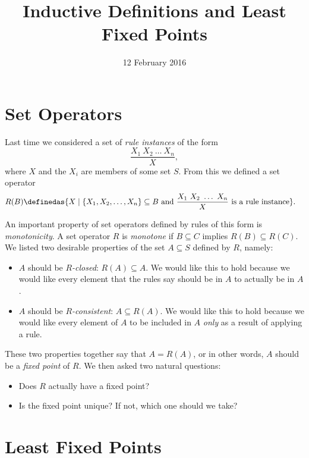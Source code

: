 \title{Inductive Definitions and Least Fixed Points}
\date{12 February 2016}
\maketitle

\section{Set Operators}

Last time we considered a set of \emph{rule instances} of the form
\begin{equation}
\frac{X_1\ X_2\ \ldots\ X_n}{X},\label{eqn:rule}
\end{equation}
where $X$ and the $X_i$ are members of some set $S$. From this we defined a set operator
\begin{align}
R(B) &\definedas \{X \mid \mbox{$\{X_1,X_2,\ldots,X_n\}\subseteq B$ and $\displaystyle\frac{X_1\ X_2\ \ldots\ X_n}X$ is a rule instance}\}.\label{eqn:rulebased}
\end{align}

An important property of set operators defined by rules of this form is \emph{monotonicity}. A set operator $R$ is \emph{monotone} if $B\subseteq C$ implies $R(B)\subseteq R(C)$. We listed two desirable properties of the set $A\subseteq S$ defined by $R$, namely:
\begin{itemize}
\item
$A$ should be \emph{$R$-closed}: $R(A)\subseteq A$. We would like this to hold because we would like every element that the rules say should be in $A$ to actually be in $A$.
\item
$A$ should be \emph{$R$-consistent}: $A\subseteq R(A)$. We would like this to hold because we would like every element of $A$ to be included in $A$ \emph{only} as a result of applying a rule.
\end{itemize}
These two properties together say that $A=R(A)$, or in other words, $A$ should be a \emph{fixed point} of $R$. We then asked two natural questions:
\begin{itemize}
\item
Does $R$ actually have a fixed point?
\item
Is the fixed point unique? If not, which one should we take?
\end{itemize}

\section{Least Fixed Points}

